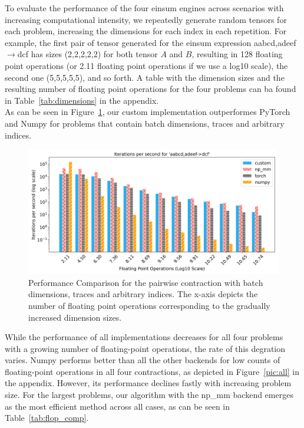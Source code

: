 \noindent To evaluate the performance of the four einsum engines across scenarios with increasing computational intensity, we repeatedly generate random tensors for each problem, increasing the dimensions for each index in each repetition. For example, the first pair of tensor generated for the einsum expression aabcd,adeef$\rightarrow$dcf has sizes (2,2,2,2,2) for both tensor $A$ and $B$, resulting in 128 floating point operations (or 2.11 floating point operations if we use a log10 scale), the second one (5,5,5,5,5), and so forth. A table with the dimension sizes and the resulting number of floating point operations for the four problems can ba found in Table~\ref{tab:dimensions} in the appendix.\\

\noindent As can be seen in Figure~\ref{flops}, our custom implementation outperformes PyTorch and Numpy for problems that contain batch dimensions, traces and arbitrary indices.
\begin{figure}[h]
    \label{flops}
    \centering
    \includegraphics[width=1\textwidth]{images/aabcd_adeef__dcf.png}  %
    \caption{Performance Comparison for the pairwise contraction with batch dimensions, traces and arbitrary indices. The x-axis depicts the number of floating point operations corresponding to the gradually increased dimension sizes.}
\end{figure}

\noindent While the performance of all implementations decreases for all four problems with a growing number of floating-point operations, the rate of this degration varies. Numpy performs better than all the other backends for low counts of floating-point operations in all four contractions, as depicted in Figure~\ref{pic:all} in the appendix. However, its performance declines fastly with increasing problem size. For the largest problems, our algorithm with the np\_mm backend emerges as the most efficient method across all cases, as can be seen in Table~\ref{tab:flop_comp}.

